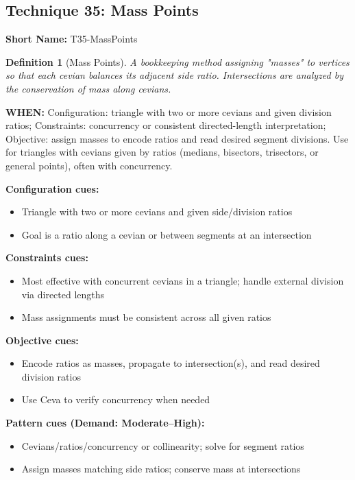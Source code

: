 \documentclass[12pt]{article}
\newtheorem{definition}{Definition}[section]
\begin{document}
\subsection{Technique 35: Mass Points}
\textbf{Short Name:} T35-MassPoints

\begin{definition}[Mass Points]
A bookkeeping method assigning "masses" to vertices so that each cevian balances its adjacent side ratio. Intersections are analyzed by the conservation of mass along cevians.
\end{definition}

\textbf{WHEN:} Configuration: triangle with two or more cevians and given division ratios; Constraints: concurrency or consistent directed-length interpretation; Objective: assign masses to encode ratios and read desired segment divisions. Use for triangles with cevians given by ratios (medians, bisectors, trisectors, or general points), often with concurrency.

\textbf{Configuration cues:}
\begin{itemize}
    \item Triangle with two or more cevians and given side/division ratios
    \item Goal is a ratio along a cevian or between segments at an intersection
\end{itemize}

\textbf{Constraints cues:}
\begin{itemize}
    \item Most effective with concurrent cevians in a triangle; handle external division via directed lengths
    \item Mass assignments must be consistent across all given ratios
\end{itemize}

\textbf{Objective cues:}
\begin{itemize}
    \item Encode ratios as masses, propagate to intersection(s), and read desired division ratios
    \item Use Ceva to verify concurrency when needed
\end{itemize}

\textbf{Pattern cues (Demand: Moderate–High):}
\begin{itemize}
    \item Cevians/ratios/concurrency or collinearity; solve for segment ratios
    \item Assign masses matching side ratios; conserve mass at intersections
\end{itemize}
\end{document}
